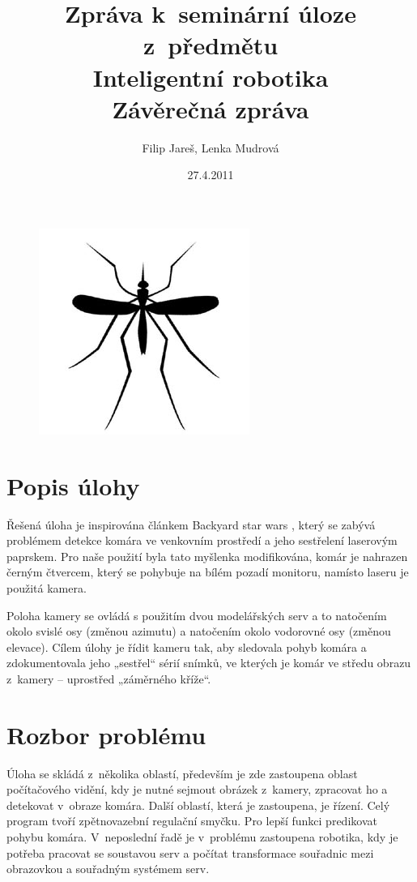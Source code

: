 \documentclass[a4paper,10pt]{article}
\title{Zpráva k~seminární úloze z~předmětu\\ Inteligentní robotika \\ {\small Závěrečná zpráva}}
\author{Filip Jareš, Lenka Mudrová}
\date{27.4.2011}
\begin{document}
\maketitle
\begin{figure}[!h]
	\centering
	\includegraphics[width=0.4\columnwidth]{pics/mosquito}
\end{figure}
\newpage

\section{Popis úlohy}
		Řešená úloha je inspirována článkem Backyard star wars \cite{zadani}, který se zabývá problémem
		detekce komára ve venkovním prostředí a jeho sestřelení laserovým paprskem. 
		Pro naše použití byla tato myšlenka modifikována, komár je nahrazen černým čtvercem, který se pohybuje na bílém 
		pozadí monitoru, namísto laseru je použitá kamera.

		Poloha kamery se ovládá s použitím dvou modelářských serv a to  
		natočením okolo svislé osy (změnou azimutu) a natočením okolo vodorovné osy (změnou elevace). Cílem úlohy
		je řídit kameru tak, aby sledovala pohyb komára a zdokumentovala jeho „sestřel“
		sérií snímků, ve kterých je komár ve středu obrazu z~kamery – uprostřed
		„záměrného kříže“.

		

\section{Rozbor problému}
		Úloha se skládá z~několika oblastí, především je zde zastoupena oblast
		po\-čí\-ta\-čo\-vé\-ho vidění, kdy je nutné sejmout obrázek z~kamery, zpracovat ho a
		detekovat v~obraze komára. 
	        Další oblastí, která je zastoupena, je řízení. Celý
		program tvoří zpětnovazební regulační smyčku.
		Pro lepší funkci predikovat pohybu komára.
		V~neposlední řadě je v~problému zastoupena robotika, kdy je potřeba pracovat se
		soustavou serv a počítat transformace souřadnic mezi obrazovkou a souřadným
		systémem serv.
\end{document}
